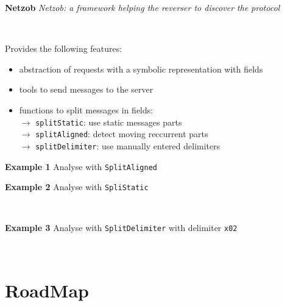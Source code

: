 \documentclass{beamer}
\newcounter{m} %
\newcounter{c} %
\begin{document}
\begin{frame}{\bf \textbf{Netzob}}
  \em{Netzob}: a framework helping the reverser to discover the protocol
 
  ~

  Provides the following features:

  \begin{itemize}
    \item abstraction of requests with a symbolic representation with fields
    \item tools to send messages to the server
    \item functions to split messages in fields:\\
    \quad\quad$\rightarrow$ \texttt{splitStatic}: use static messages parts\\
    \quad\quad$\rightarrow$ \texttt{splitAligned}: detect moving reccurrent parts\\
    \quad\quad$\rightarrow$ \texttt{splitDelimiter}: use manually entered delimiters
  \end{itemize}

\end{frame}


\begin{frame}{\bf Example 1}
  Analyse with \texttt{SplitAligned}
  ~

  \tiny
\end{frame}

\begin{frame}{\bf Example 2}
  Analyse with \texttt{SpliStatic}

  ~

  \tiny
\end{frame}

\begin{frame}{\bf Example 3}
  Analyse with \texttt{SplitDelimiter} with delimiter \texttt{x02}

  ~

  \tiny
\end{frame}

\section{RoadMap}
\end{document}
